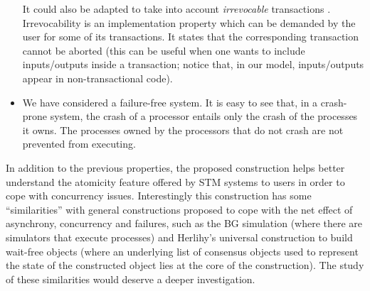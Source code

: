 \begin{itemize}
It could also be adapted to  take into account {\it irrevocable} transactions
\cite{SSDMS08,WSA08}. 
Irrevocability is an implementation property which can be 
demanded by the user for  some of its transactions. It states that 
the corresponding transaction cannot be aborted (this can be useful when 
one wants to include inputs/outputs inside a transaction; notice that, 
in our model, inputs/outputs appear in non-transactional code). 
%
\item  
We have considered a failure-free system. It is easy to see that, in a
 crash-prone system, the crash of a processor entails only the
crash of the processes it owns.  The processes owned by the processors that
do not crash are not prevented from executing.  
%
%
\end{itemize}

In addition to the previous properties, 
the proposed  construction helps better understand the atomicity feature  
offered  by STM systems to users in order to cope with concurrency issues. 
Interestingly this construction has some ``similarities'' with 
general constructions proposed to cope with the net effect of 
asynchrony, concurrency and failures, such as 
the BG simulation \cite{BG93}  (where there are simulators that execute 
processes) and   Herlihy's universal construction to  build  wait-free 
objects \cite{H91} (where an underlying list of consensus objects 
used to represent the state of the constructed object lies at the 
core of the construction). The study of these  similarities would 
deserve a  deeper investigation. 



%



% 


